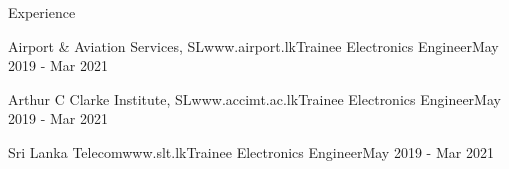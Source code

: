 \documentclass[
	11pt, %
]{./assets/resume} %
\begin{document}
\begin{rSection}{Experience}
	\begin{rSubsectionSimpleX}{Airport \& Aviation Services, SL}{www.airport.lk}{Trainee Electronics Engineer}{May 2019 - Mar 2021}
	\end{rSubsectionSimpleX}

	\begin{rSubsectionSimpleX}{Arthur C Clarke Institute, SL}{www.accimt.ac.lk}{Trainee Electronics Engineer}{May 2019 - Mar 2021}
	\end{rSubsectionSimpleX}

	\begin{rSubsectionSimpleX}{Sri Lanka Telecom}{www.slt.lk}{Trainee Electronics Engineer}{May 2019 - Mar 2021}
	\end{rSubsectionSimpleX}


\end{rSection}

\end{document}
